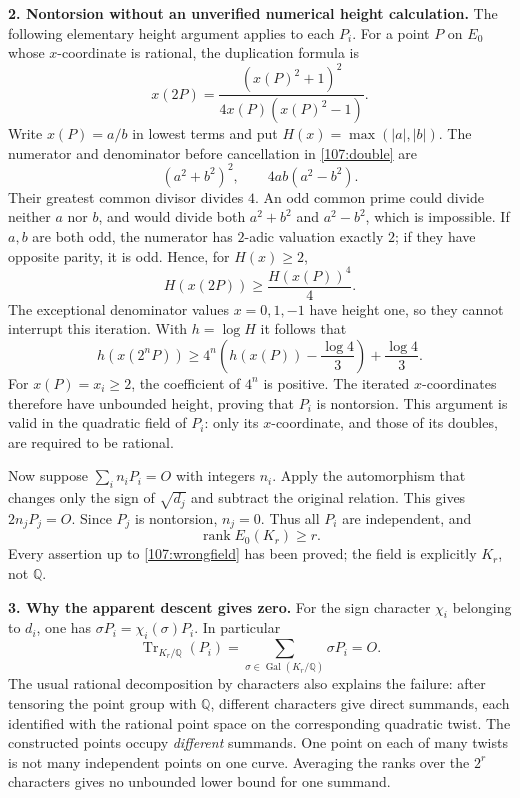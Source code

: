 \documentclass[11pt,a4paper]{article}
\newcommand{\Q}{\mathbb{Q}}
\numberwithin{equation}{section}
\begin{document}
\medskip
\textbf{2. Nontorsion without an unverified numerical height calculation.}
The following elementary height argument applies to each $P_i$. For a point
$P$ on $E_0$ whose $x$-coordinate is rational, the duplication formula is
\begin{equation}\label{107:double}
 x(2P)=\frac{(x(P)^2+1)^2}{4x(P)(x(P)^2-1)}.
\end{equation}
Write $x(P)=a/b$ in lowest terms and put $H(x)=\max(|a|,|b|)$. The numerator
and denominator before cancellation in \eqref{107:double} are
\[
 (a^2+b^2)^2,\qquad 4ab(a^2-b^2).
\]
Their greatest common divisor divides $4$. An odd common prime could divide
neither $a$ nor $b$, and would divide both $a^2+b^2$ and $a^2-b^2$, which is
impossible. If $a,b$ are both odd, the numerator has $2$-adic valuation
exactly $2$; if they have opposite parity, it is odd. Hence, for $H(x)\geq2$,
\begin{equation}\label{107:height}
 H(x(2P))\geq\frac{H(x(P))^4}{4}.
\end{equation}
The exceptional denominator values $x=0,1,-1$ have height one, so they cannot
interrupt this iteration. With $h=\log H$ it follows that
\[
 h(x(2^nP))\geq
 4^n\left(h(x(P))-\frac{\log4}{3}\right)+\frac{\log4}{3}.
\]
For $x(P)=x_i\geq2$, the coefficient of $4^n$ is positive. The iterated
$x$-coordinates therefore have unbounded height, proving that $P_i$ is
nontorsion. This argument is valid in the quadratic field of $P_i$: only
its $x$-coordinate, and those of its doubles, are required to be rational.

Now suppose $\sum_i n_iP_i=O$ with integers $n_i$. Apply the automorphism
that changes only the sign of $\sqrt{d_j}$ and subtract the original
relation. This gives $2n_jP_j=O$. Since $P_j$ is nontorsion, $n_j=0$.
Thus all $P_i$ are independent, and
\begin{equation}\label{107:wrongfield}
 \operatorname{rank}E_0(K_r)\geq r.
\end{equation}
Every assertion up to \eqref{107:wrongfield} has been proved; the field is
explicitly $K_r$, not $\Q$.

\medskip
\textbf{3. Why the apparent descent gives zero.}
For the sign character $\chi_i$ belonging to $d_i$, one has
$\sigma P_i=\chi_i(\sigma)P_i$. In particular
\[
 \operatorname{Tr}_{K_r/\Q}(P_i)
 =\sum_{\sigma\in\operatorname{Gal}(K_r/\Q)}\sigma P_i=O.
\]
The usual rational decomposition by characters also explains the failure:
after tensoring the point group with $\Q$, different characters give direct
summands, each identified with the rational point space on the corresponding
quadratic twist. The constructed points occupy \emph{different} summands.
One point on each of many twists is not many independent points on one
curve. Averaging the ranks over the $2^r$ characters gives no unbounded
lower bound for one summand.
\end{document}
